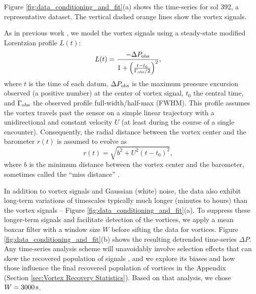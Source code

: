 \documentclass{aastex63}
\begin{document}
Figure \ref{fig:data_conditioning_and_fit}(a) shows the time-series for sol 392, a representative dataset. The vertical dashed orange lines show the vortex signals.

As in previous work \citep[e.g.][]{2016JGRE..121.1514K}, we model the vortex signals using a steady-state modified Lorentzian profile $L(t)$:
\begin{equation}
    L(t) = \frac{-\Delta P_{\rm obs}}{1 + \left( \frac{ t - t_0 }{\Gamma_{\rm obs}/2} \right)^2},\label{eqn:Lorentzian_profile}
\end{equation}
where $t$ is the time of each datum, $\Delta P_{\rm obs}$ is the maximum pressure excursion observed (a positive number) at the center of vortex signal, $t_0$ the central time, and $\Gamma_{\rm obs}$ the observed profile full-width/half-max (FWHM). This profile assumes the vortex travels past the sensor on a simple linear trajectory with a unidirectional and constant velocity $U$ (at least during the course of a single encounter). Consequently, the radial distance between the vortex center and the barometer $r(t)$ is assumed to evolve as 
\begin{equation}
    r(t) = \sqrt{b^2 + U^2 \left( t - t_0 \right)^2},\label{eqn:radial_distance}
\end{equation}
where $b$ is the minimum distance between the vortex center and the barometer, sometimes called the ``miss distance'' \citep[e.g.][]{2018Icar..299..166J}. 

In addition to vortex signals and Gaussian (white) noise, the data also exhibit long-term variations of timescales typically much longer (minutes to hours) than the vortex signals -- Figure \ref{fig:data_conditioning_and_fit}(a). To suppress these longer-term signals and facilitate detection of the vortices, we apply a mean boxcar filter with a window size $W$ before sifting the data for vortices. Figure \ref{fig:data_conditioning_and_fit}(b) shows the resulting detrended time-series $\Delta P$. Any time-series analysis scheme will unavoidably involve selection effects that can skew the recovered population of signals \citep{2018Icar..299..166J}, and we explore its biases and how those influence the final recovered population of vortices in the Appendix (Section \ref{sec:Vortex Recovery Statistics}). Based on that analysis, we chose $W = 3000\,{\rm s}$. 
\end{document}

